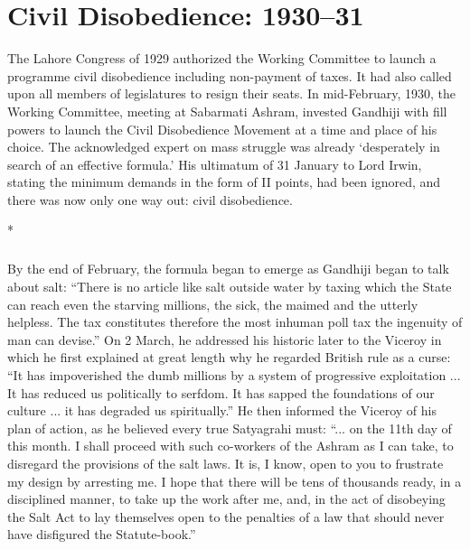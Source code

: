 \chapter{Civil Disobedience: 1930--31}
\begin{multicols}{2}

The Lahore Congress of 1929 authorized the Working Committee to launch a programme civil disobedience including non-payment of taxes. It had also called upon all members of legislatures to resign their seats. In mid-February, 1930, the Working Committee, meeting at Sabarmati Ashram, invested Gandhiji with fill powers to launch the Civil Disobedience Movement at a time and place of his choice. The acknowledged expert on mass struggle was already `desperately in search of an effective formula.' His ultimatum of 31 January to Lord Irwin, stating the minimum demands in the form of II points, had been ignored, and there was now only one way out: civil disobedience.

\begin{center}*\end{center}

\paragraph*{}
By the end of February, the formula began to emerge as Gandhiji began to talk about salt: ``There is no article like salt outside water by taxing which the State can reach even the starving millions, the sick, the maimed and the utterly helpless. The tax constitutes therefore the most inhuman poll tax the ingenuity of man can devise.'' On 2 March, he addressed his historic later to the Viceroy in which he first explained at great length why he regarded British rule as a curse: ``It has impoverished the dumb millions by a system of progressive exploitation ... It has reduced us politically to serfdom. It has sapped the foundations of our culture ... it has degraded us spiritually.'' He then informed the Viceroy of his plan of action, as he believed every true Satyagrahi must: ``... on the 11th day of this month. I shall proceed with such co-workers of the Ashram as I can take, to disregard the provisions of the salt laws. It is, I know, open to you to frustrate my design by arresting me. I hope that there will be tens of thousands ready, in a disciplined manner, to take up the work after me, and, in the act of disobeying the Salt Act to lay themselves open to the penalties of a law that should never have disfigured the Statute-book.''


\end{multicols}
